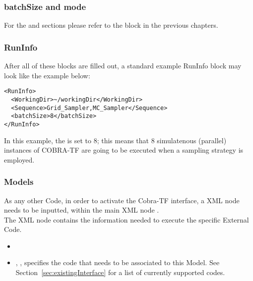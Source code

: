 \subsubsection{batchSize and mode}
For the  and  sections please refer to the
 block in the previous chapters.

\subsubsection{RunInfo}
After all of these blocks are filled out, a standard example RunInfo block may
look like the example below:
\begin{lstlisting}[style=XML]
<RunInfo>
  <WorkingDir>~/workingDir</WorkingDir>
  <Sequence>Grid_Sampler,MC_Sampler</Sequence>
  <batchSize>8</batchSize>
</RunInfo>
\end{lstlisting}
In this example, the  is set to $8$; this means that 8 simulatenous (parallel) instances
of COBRA-TF are going to be executed when a sampling strategy is employed.

\subsubsection{Models}
As any other Code, in order to activate the Cobra-TF interface, a  XML node needs to be inputted, within the 
main XML node . 
\\The  {} XML node contains the 
information needed to execute the specific External Code.

\attrsIntro
%
\vspace{-5mm}
\begin{itemize}
  \itemsep0em
  \item \nameDescription
  \item {}, , specifies the
  code that needs to be associated to this Model.
  \nb See Section~\ref{sec:existingInterface} for a list of currently supported
  codes.
\end{itemize}
\vspace{-5mm}

